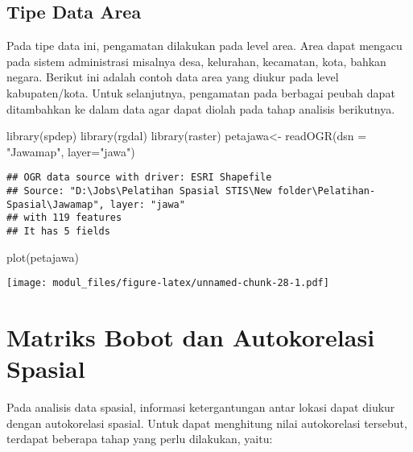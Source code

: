 \documentclass[
]{book}
\newenvironment{Shaded}{\begin{snugshade}}{\end{snugshade}}
\newcommand{\AttributeTok}[1]{\textcolor[rgb]{0.77,0.63,0.00}{#1}}
\newcommand{\FunctionTok}[1]{\textcolor[rgb]{0.00,0.00,0.00}{#1}}
\newcommand{\NormalTok}[1]{#1}
\newcommand{\OtherTok}[1]{\textcolor[rgb]{0.56,0.35,0.01}{#1}}
\newcommand{\StringTok}[1]{\textcolor[rgb]{0.31,0.60,0.02}{#1}}
\begin{document}
\hypertarget{tipe-data-area}{%
\subsection{Tipe Data Area}\label{tipe-data-area}}

Pada tipe data ini, pengamatan dilakukan pada level area. Area dapat mengacu pada sistem administrasi misalnya desa, kelurahan, kecamatan, kota, bahkan negara. Berikut ini adalah contoh data area yang diukur pada level kabupaten/kota. Untuk selanjutnya, pengamatan pada berbagai peubah dapat ditambahkan ke dalam data agar dapat diolah pada tahap analisis berikutnya.

\begin{Shaded}
\begin{Highlighting}[]
\FunctionTok{library}\NormalTok{(spdep)}
\FunctionTok{library}\NormalTok{(rgdal)}
\FunctionTok{library}\NormalTok{(raster)}
\NormalTok{petajawa}\OtherTok{\textless{}{-}} \FunctionTok{readOGR}\NormalTok{(}\AttributeTok{dsn =} \StringTok{"Jawamap"}\NormalTok{, }\AttributeTok{layer=}\StringTok{"jawa"}\NormalTok{)}
\end{Highlighting}
\end{Shaded}

\begin{verbatim}
## OGR data source with driver: ESRI Shapefile 
## Source: "D:\Jobs\Pelatihan Spasial STIS\New folder\Pelatihan-Spasial\Jawamap", layer: "jawa"
## with 119 features
## It has 5 fields
\end{verbatim}

\begin{Shaded}
\begin{Highlighting}[]
\FunctionTok{plot}\NormalTok{(petajawa)}
\end{Highlighting}
\end{Shaded}

\texttt{[image: modul\_files/figure-latex/unnamed-chunk-28-1.pdf]}

\hypertarget{matriks-bobot-dan-autokorelasi-spasial}{%
\section{Matriks Bobot dan Autokorelasi Spasial}\label{matriks-bobot-dan-autokorelasi-spasial}}

Pada analisis data spasial, informasi ketergantungan antar lokasi dapat diukur dengan autokorelasi spasial. Untuk dapat menghitung nilai autokorelasi tersebut, terdapat beberapa tahap yang perlu dilakukan, yaitu:
\end{document}

